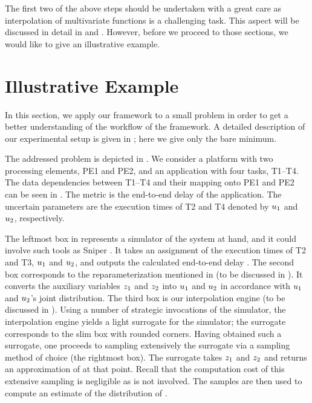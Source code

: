 The first two of the above steps should be undertaken with a great care as
interpolation of multivariate functions is a challenging task. This aspect will
be discussed in detail in  and . However,
before we proceed to those sections, we would like to give an illustrative
example.

\section{Illustrative Example}

In this section, we apply our framework to a small problem in order to get a
better understanding of the workflow of the framework. A detailed description of
our experimental setup is given in ; here we give only the
bare minimum.

The addressed problem is depicted in . We consider a platform with
two processing elements, PE1 and PE2, and an application with four tasks,
T1--T4. The data dependencies between T1--T4 and their mapping onto PE1 and PE2
can be seen in . The metric \g is the end-to-end delay of the
application. The uncertain parameters \vu are the execution times of T2 and T4
denoted by $u_1$ and $u_2$, respectively.

The leftmost box in  represents a simulator of the system at hand,
and it could involve such tools as Sniper \cite{carlson2011}. It takes an
assignment of the execution times of T2 and T3, $u_1$ and $u_2$, and outputs
the calculated end-to-end delay \g. The second box corresponds to the
reparameterization mentioned in  (to be discussed in
). It converts the auxiliary variables $z_1$ and $z_2$ into
$u_1$ and $u_2$ in accordance with $u_1$ and $u_2$'s joint distribution. The
third box is our interpolation engine (to be discussed in ).
Using a number of strategic invocations of the simulator, the interpolation
engine yields a light surrogate for the simulator; the surrogate corresponds to
the slim box with rounded corners. Having obtained such a surrogate, one
proceeds to sampling extensively the surrogate via a sampling method of choice
(the rightmost box). The surrogate takes $z_1$ and $z_2$ and returns an
approximation of \g at that point. Recall that the computation cost of this
extensive sampling is negligible as \g is not involved. The samples are then
used to compute an estimate of the distribution of \g.

